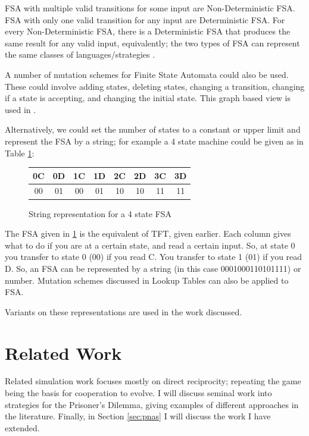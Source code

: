 \documentclass[a4paper,11pt,bcshonoursthesis,singlespace,oneside,thesisdraft,pdflatex]{cssethesis}
\renewcommand{\cite}{\citep} %
\begin{document}
FSA with multiple valid transitions for some input are Non-Deterministic FSA. 
FSA with only one valid transition for any input are Deterministic FSA. 
For every Non-Deterministic FSA, there is a Deterministic FSA that produces the same result for any valid input, equivalently; the two types of FSA can represent the same classes of languages/strategies \citep[][pp 35 -- 63]{Sipser2006}. 

A number of mutation schemes for Finite State Automata could also be used. 
These could involve adding states, deleting states, changing a transition, changing if a state is accepting, and changing the initial state. 
This graph based view is used in \cite{van-veelen:PNAS:2012}. 

Alternatively, we could set the number of states to a constant or upper limit and represent the FSA by a string; for example a 4 state machine could be given as in Table \ref{table:fsa4state}:
\begin{figure}[h]
\center
\begin{tabular}{|c|c|c|c|c|c|c|c|}
\hline
0C & 0D & 1C&1D&2C&2D&3C&3D\\
\hline
00 & 01 & 00&01&10&10&11&11\\
\hline
\end{tabular}\hfill
\caption{String representation for a 4 state FSA}
\label{table:fsa4state}
\end{figure}
The FSA given in \ref{table:fsa4state} is the equivalent of TFT, given earlier. 
Each column gives what to do if you are at a certain state, and read a certain input. 
So, at state 0 you transfer to state 0 (00) if you read C. 
You transfer to state 1 (01) if you read D. 
So, an FSA can be represented by a string (in this case 0001000110101111) or number. 
Mutation schemes discussed in Lookup Tables can also be applied to FSA. 

Variants on these representations are used in the work discussed.
\section{Related Work}
\label{sec:relatedWork}
Related simulation work focuses mostly on direct reciprocity; repeating the game being the basis for cooperation to evolve. 
I will discuss seminal work into strategies for the Prisoner's Dilemma, giving examples of different approaches in the literature. Finally, in Section \ref{sec:pnas} I will discuss the work I have extended.
\end{document}

